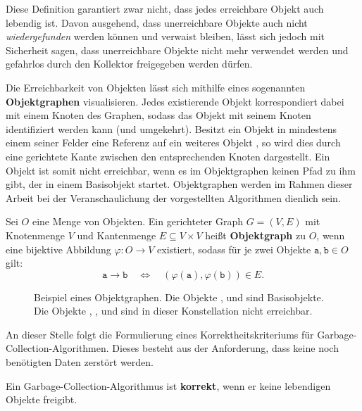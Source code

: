 Diese Definition garantiert zwar nicht, dass jedes erreichbare Objekt auch lebendig ist.
Davon ausgehend, dass unerreichbare Objekte auch nicht \textit{wiedergefunden} werden können und verwaist bleiben, lässt sich jedoch mit Sicherheit sagen, dass unerreichbare Objekte nicht mehr verwendet werden und gefahrlos durch den Kollektor freigegeben werden dürfen.

Die Erreichbarkeit von Objekten lässt sich mithilfe eines sogenannten \textbf{Objektgraphen} visualisieren.
Jedes existierende Objekt korrespondiert dabei mit einem Knoten des Graphen, sodass das Objekt mit seinem Knoten identifiziert werden kann (und umgekehrt).
Besitzt ein Objekt  in mindestens einem seiner Felder eine Referenz auf ein weiteres Objekt , so wird dies durch eine gerichtete Kante zwischen den entsprechenden Knoten dargestellt.
Ein Objekt ist somit nicht erreichbar, wenn es im Objektgraphen keinen Pfad zu ihm gibt, der in einem Basisobjekt startet.
Objektgraphen werden im Rahmen dieser Arbeit bei der Veranschaulichung der vorgestellten Algorithmen dienlich sein.

\begin{mybox}
\begin{defn}[Objektgraph]
	Sei $O$ eine Menge von Objekten.
	Ein gerichteter Graph $G = (V,E)$ mit Knotenmenge $V$ und Kantenmenge $E \subseteq V \times V$ heißt \textbf{Objektgraph} zu $O$, wenn eine bijektive Abbildung $\varphi \colon O \rightarrow V$ existiert, sodass für je zwei Objekte $\mathtt{a,b} \in O$ gilt:
	\[
		\mathtt{a} \rightarrow \mathtt{b} \quad \Leftrightarrow \quad (\varphi(\mathtt{a}),\varphi(\mathtt{b})) \in E.
	\]
\end{defn}
\end{mybox}

\begin{figure}[h]
	\centering
	
	\caption[Beispiel eines Objektgraphen]{Beispiel eines Objektgraphen. Die Objekte ,  und  sind Basisobjekte. Die Objekte , ,  und  sind in dieser Konstellation nicht erreichbar.}
\end{figure}

An dieser Stelle folgt die Formulierung eines Korrektheitskriteriums für Garbage-Collection-Algorithmen.
Dieses besteht aus der Anforderung, dass keine noch benötigten Daten zerstört werden.

\begin{mybox}
\begin{defn}
	Ein Garbage-Collection-Algorithmus ist \textbf{korrekt}, wenn er keine lebendigen Objekte freigibt.
\end{defn}
\end{mybox}

